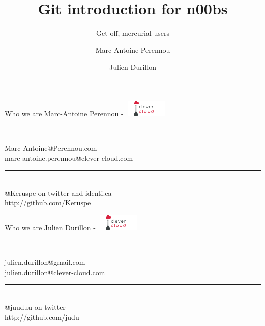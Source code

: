 \documentclass{beamer}
\title{Git introduction for n00bs}
\subtitle{Get off, mercurial users}
\author[Keruspe \and Judu]{Marc-Antoine Perennou \and Julien Durillon}
\institute[CC]{Clever Cloud -- http://www.clever-cloud.com/}
\date{}
\begin{document}
\begin{frame}[plain]
    \titlepage
\end{frame}

\begin{frame}{Who we are}
      Marc-Antoine Perennou - \includegraphics[width=80px,height=30px]{logo-cc.png} \\[0.5cm]
      \hrule \hfill \\[0.5cm]
      Marc-Antoine@Perennou.com \\
      marc-antoine.perennou@clever-cloud.com \\[0.5cm]
      \hrule \hfill \\[0.5cm]
      @Keruspe on twitter and identi.ca \\
      http://github.com/Keruspe
\end{frame}
\begin{frame}{Who we are}
      Julien Durillon - \includegraphics[width=80px,height=30px]{logo-cc.png} \\[0.5cm]
      \hrule \hfill \\[0.5cm]
      julien.durillon@gmail.com \\
      julien.durillon@clever-cloud.com \\[0.5cm]
      \hrule \hfill \\[0.5cm]
      @juuduu on twitter \\
      http://github.com/judu
\end{frame}
\end{document}

